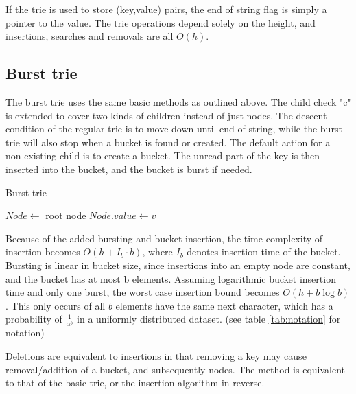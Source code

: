If the trie is used to store (key,value) pairs, the end of string flag is
simply a pointer to the value. The trie operations depend solely on the height,
and insertions, searches and removals are all $O(h)$.

\subsection{Burst trie}
The burst trie uses the same basic methods as outlined above. The child check
"c" is extended to cover two kinds of children instead of just nodes. The
descent condition of the regular trie is to move down until end of string, while
the burst trie will also stop when a bucket is found or created.
The default action for a non-existing child is to create a bucket. The unread part
of the key is then inserted into the bucket, and the bucket is burst if needed.

\begin{algorithm}[H]
    \caption{Burst trie }
    \label{alg:bt_insert}


    $Node \leftarrow$  root node\;
    $Node.value \leftarrow v$\;
\end{algorithm}

Because of the added bursting and bucket insertion, the time complexity of
insertion becomes $O(h+I_b\cdot b)$, where $I_b$ denotes insertion time of the
bucket. Bursting is linear in bucket size, since insertions into an empty node
are constant, and the bucket has at most b elements.
Assuming logarithmic bucket insertion time and only one burst, the worst case
insertion bound becomes $O(h+b \log b)$. This only occurs
of all $b$ elements have the same next character, which has a probability of
$\frac{1}{\alpha^b}$ in a uniformly distributed dataset.
(see table \ref{tab:notation} for notation)

Deletions are equivalent to insertions in that removing a key may cause
removal/addition of a bucket, and subsequently nodes. The method is equivalent
to that of the basic trie, or the insertion algorithm in reverse.


